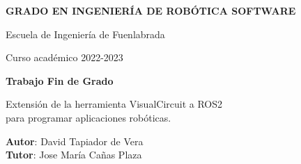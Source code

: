 \thispagestyle{empty}
\vspace{2cm}

\begin{figure}[htb]
  \centerline{}
\end{figure}

\begin{center}
  {\Large {\bf GRADO EN INGENIERÍA DE ROBÓTICA SOFTWARE}}
  \vspace{5mm}
 
  {\large {Escuela de Ingeniería de Fuenlabrada}}
  \vspace{5mm}

  {\large {Curso académico 2022-2023}}

  \vspace{1cm}

  {\large {\bf Trabajo Fin de Grado}}

  \vspace{2cm}

  {\Large {Extensión de la herramienta VisualCircuit a ROS2\\
      para programar aplicaciones robóticas.}}

  \vspace{5cm}
  {\bf Autor}: David Tapiador de Vera\\
  {\bf Tutor}: Jose María Cañas Plaza
\end{center}

\clearpage
\thispagestyle{empty}
